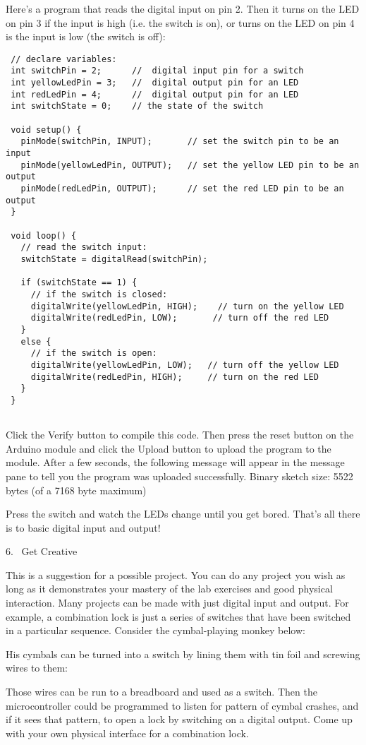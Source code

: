 Here's a program that reads the digital input on pin 2. Then it turns on the LED on pin 3 if the input is high (i.e. the switch is on), or turns on the LED on pin 4 is the input is low (the switch is off):

\begin{verbatim}
 // declare variables:
 int switchPin = 2;      //  digital input pin for a switch
 int yellowLedPin = 3;   //  digital output pin for an LED
 int redLedPin = 4;      //  digital output pin for an LED
 int switchState = 0;    // the state of the switch

 void setup() {
   pinMode(switchPin, INPUT);       // set the switch pin to be an input
   pinMode(yellowLedPin, OUTPUT);   // set the yellow LED pin to be an output
   pinMode(redLedPin, OUTPUT);      // set the red LED pin to be an output
 }

 void loop() {
   // read the switch input:
   switchState = digitalRead(switchPin);

   if (switchState == 1) {
     // if the switch is closed:
     digitalWrite(yellowLedPin, HIGH);    // turn on the yellow LED
     digitalWrite(redLedPin, LOW);       // turn off the red LED
   } 
   else {
     // if the switch is open:
     digitalWrite(yellowLedPin, LOW);   // turn off the yellow LED
     digitalWrite(redLedPin, HIGH);     // turn on the red LED
   }
 }
 
\end{verbatim}

Click the Verify button to compile this code. Then press the reset button on the Arduino module and click the Upload button to upload the program to the module. After a few seconds, the following message will appear in the message pane to tell you the program was uploaded successfully.
Binary sketch size: 5522 bytes (of a 7168 byte maximum)

Press the switch and watch the LEDs change until you get bored. That's all there is to basic digital input and output!

6.  Get Creative

This is a suggestion for a possible project. You can do any project you wish as long as it demonstrates your mastery of the lab exercises and good physical interaction.
Many projects can be made with just digital input and output. For example, a combination lock is just a series of switches that have been switched in a particular sequence. Consider the cymbal-playing monkey below:

His cymbals can be turned into a switch by lining them with tin foil and screwing wires to them:



Those wires can be run to a breadboard and used as a switch. Then the microcontroller could be programmed to listen for pattern of cymbal crashes, and if it sees that pattern, to open a lock by switching on a digital output.
Come up with your own physical interface for a combination lock.
